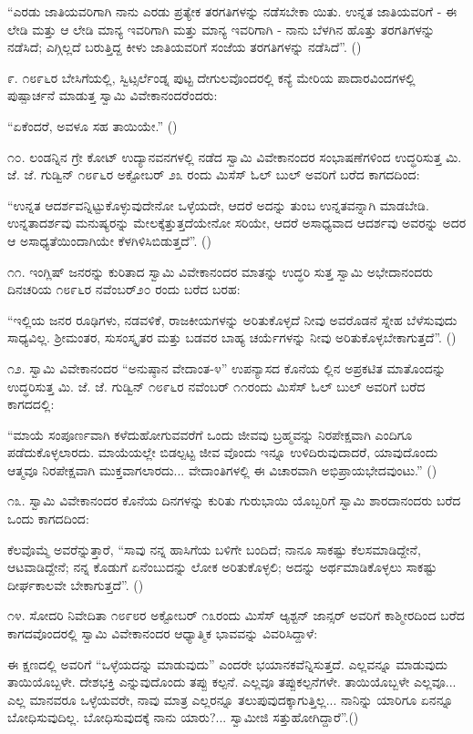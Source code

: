“ಎರಡು ಜಾತಿಯವರಿಗಾಗಿ ನಾನು ಎರಡು ಪ್ರತ್ಯೇಕ ತರಗತಿಗಳನ್ನು ನಡೆಸಬೇಕಾ ಯಿತು. ಉನ್ನತ ಜಾತಿಯವರಿಗೆ - ಈ ಲೇಡಿ ಮತ್ತು ಆ ಲೇಡಿ ಮಾನ್ಯ ಇವರಿಗಾಗಿ ಮತ್ತು ಮಾನ್ಯ ಇವರಿಗಾಗಿ - ನಾನು ಬೆಳಗಿನ ಹೊತ್ತು ತರಗತಿಗಳನ್ನು ನಡೆಸಿದೆ; ಎಗ್ಗಿಲ್ಲದೆ ಬರುತ್ತಿದ್ದ ಕೀಳು ಜಾತಿಯವರಿಗೆ ಸಂಜೆಯ ತರಗತಿಗಳನ್ನು ನಡೆಸಿದೆ”. ()

೯. ೧೮೯೬ರ ಬೇಸಿಗೆಯಲ್ಲಿ, ಸ್ವಿಟ್ಸರ್ಲೆಂಡ್ನ ಪುಟ್ಟ ದೇಗುಲವೊಂದರಲ್ಲಿ ಕನ್ಯೆ ಮೇರಿಯ ಪಾದಾರವಿಂದಗಳಲ್ಲಿ ಪುಷ್ಪಾರ್ಚನೆ ಮಾಡುತ್ತ ಸ್ವಾಮಿ ವಿವೇಕಾನಂದರೆಂದರು:

“ಏಕೆಂದರೆ, ಅವಳೂ ಸಹ ತಾಯಿಯೇ.” ()

೧೦. ಲಂಡನ್ನಿನ ಗ್ರೇ ಕೋಟ್ ಉದ್ಯಾನವನಗಳಲ್ಲಿ ನಡೆದ ಸ್ವಾಮಿ ವಿವೇಕಾನಂದರ ಸಂಭಾಷಣೆಗಳಿಂದ ಉದ್ಧರಿಸುತ್ತ ಮಿ. ಜೆ. ಜೆ. ಗುಡ್ವಿನ್ ೧೮೯೬ರ ಅಕ್ಟೋಬರ್ ೨೩ ರಂದು ಮಿಸೆಸ್ ಓಲ್ ಬುಲ್ ಅವರಿಗೆ ಬರೆದ ಕಾಗದದಿಂದ:

“ಉನ್ನತ ಆದರ್ಶವನ್ನಿಟ್ಟುಕೊಳ್ಳುವುದೇನೋ ಒಳ್ಳೆಯದೇ, ಆದರೆ ಅದನ್ನು ತುಂಬ ಉನ್ನತವನ್ನಾಗಿ ಮಾಡಬೇಡಿ. ಉನ್ನತಾದರ್ಶವು ಮನುಷ್ಯರನ್ನು ಮೇಲಕ್ಕೆತ್ತುತ್ತದೆಯೇನೋ ಸರಿಯೇ, ಆದರೆ ಅಸಾಧ್ಯವಾದ ಆದರ್ಶವು ಅವರನ್ನು ಅದರ ಆ ಅಸಾಧ್ಯತೆಯಿಂದಾಗಿಯೇ ಕೆಳಗಿಳಿಸಿಬಿಡುತ್ತದೆ”. ()

೧೧. ಇಂಗ್ಲಿಷ್ ಜನರನ್ನು ಕುರಿತಾದ ಸ್ವಾಮಿ ವಿವೇಕಾನಂದರ ಮಾತನ್ನು ಉದ್ಧರಿ ಸುತ್ತ ಸ್ವಾಮಿ ಅಭೇದಾನಂದರು ದಿನಚರಿಯ ೧೮೯೬ರ ನವೆಂಬರ್೨೦ ರಂದು ಬರೆದ ಬರಹ:

“ಇಲ್ಲಿಯ ಜನರ ರೂಢಿಗಳು, ನಡವಳಿಕೆ, ರಾಜಕೀಯಗಳನ್ನು ಅರಿತುಕೊಳ್ಳದೆ ನೀವು ಅವರೊಡನೆ ಸ್ನೇಹ ಬೆಳೆಸುವುದು ಸಾಧ್ಯವಿಲ್ಲ. ಶ‍್ರೀಮಂತರ, ಸುಸಂಸ್ಕೃತರ ಮತ್ತು ಬಡವರ ಬಾಹ್ಯ ಚರ್ಯೆಗಳನ್ನು ನೀವು ಅರಿತುಕೊಳ್ಳಬೇಕಾಗುತ್ತದೆ”. ()

೧೨. ಸ್ವಾಮಿ ವಿವೇಕಾನಂದರ “ಅನುಷ್ಠಾನ ವೇದಾಂತ-೪” ಉಪನ್ಯಾಸದ ಕೊನೆಯ ಲ್ಲಿನ ಅಪ್ರಕಟಿತ ಮಾತೊಂದನ್ನು ಉದ್ಧರಿಸುತ್ತ ಮಿ. ಜೆ. ಜೆ. ಗುಡ್ವಿನ್ ೧೮೯೬ರ ನವೆಂಬರ್ ೧೧ರಂದು ಮಿಸೆಸ್ ಓಲ್ ಬುಲ್ ಅವರಿಗೆ ಬರೆದ ಕಾಗದದಲ್ಲಿ:

“ಮಾಯೆ ಸಂಪೂರ್ಣವಾಗಿ ಕಳೆದುಹೋಗುವವರೆಗೆ ಒಂದು ಜೀವವು ಬ್ರಹ್ಮವನ್ನು ನಿರಪೇಕ್ಷವಾಗಿ ಎಂದಿಗೂ ಪಡೆದುಕೊಳ್ಳಲಾರದು. ಮಾಯೆಯಲ್ಲೇ ಬಿಡಲ್ಪಟ್ಟ ಜೀವ ವೊಂದು ಇನ್ನೂ ಉಳಿದಿರುವುದಾದರೆ, ಯಾವುದೊಂದು ಆತ್ಮವೂ ನಿರಪೇಕ್ಷವಾಗಿ ಮುಕ್ತವಾಗಲಾರದು... ವೇದಾಂತಿಗಳಲ್ಲಿ ಈ ವಿಚಾರವಾಗಿ ಅಭಿಪ್ರಾಯಭೇದವುಂಟು.” ()

೧೩. ಸ್ವಾಮಿ ವಿವೇಕಾನಂದರ ಕೊನೆಯ ದಿನಗಳನ್ನು ಕುರಿತು ಗುರುಭಾಯಿ ಯೊಬ್ಬರಿಗೆ ಸ್ವಾಮಿ ಶಾರದಾನಂದರು ಬರೆದ ಒಂದು ಕಾಗದದಿಂದ:

ಕೆಲವೊಮ್ಮೆ ಅವರೆನ್ನುತ್ತಾರೆ, “ಸಾವು ನನ್ನ ಹಾಸಿಗೆಯ ಬಳಿಗೇ ಬಂದಿದೆ; ನಾನೂ ಸಾಕಷ್ಟು ಕೆಲಸಮಾಡಿದ್ದೇನೆ, ಆಟವಾಡಿದ್ದೇನೆ; ನನ್ನ ಕೊಡುಗೆ ಏನೆಂಬುದನ್ನು ಲೋಕ ಅರಿತುಕೊಳ್ಳಲಿ; ಅದನ್ನು ಅರ್ಥಮಾಡಿಕೊಳ್ಳಲು ಸಾಕಷ್ಟು ದೀರ್ಘಕಾಲವೇ ಬೇಕಾಗುತ್ತದೆ”. ()

೧೪. ಸೋದರಿ ನಿವೇದಿತಾ ೧೮೯೮ರ ಅಕ್ಟೋಬರ್ ೧೩ರಂದು ಮಿಸೆಸ್ ಆ್ಯಶ್ಟನ್ ಜಾನ್ಸರ್ ಅವರಿಗೆ ಕಾಶ್ಮೀರದಿಂದ ಬರೆದ ಕಾಗದವೊಂದರಲ್ಲಿ ಸ್ವಾಮಿ ವಿವೇಕಾನಂದರ ಆಧ್ಯಾತ್ಮಿಕ ಭಾವವನ್ನು ವಿವರಿಸಿದ್ದಾಳೆ:

ಈ ಕ್ಷಣದಲ್ಲಿ ಅವರಿಗೆ “ಒಳ್ಳೆಯದನ್ನು ಮಾಡುವುದು” ಎಂದರೇ ಭಯಾನಕವೆನ್ನಿಸುತ್ತದೆ. ಎಲ್ಲವನ್ನೂ ಮಾಡುವುದು ತಾಯಿಯೊಬ್ಬಳೇ. ದೇಶಭಕ್ತಿ ಎನ್ನುವುದೊಂದು ತಪ್ಪು ಕಲ್ಪನೆ. ಎಲ್ಲವೂ ತಪ್ಪುಕಲ್ಪನೆಗಳೇ. ತಾಯಿಯೊಬ್ಬಳೇ ಎಲ್ಲವೂ... ಎಲ್ಲ ಮಾನವರೂ ಒಳ್ಳೆಯವರೇ, ನಾವು ಮಾತ್ರ ಎಲ್ಲರನ್ನೂ ತಲುಪುವುದಕ್ಕಾಗುತ್ತಿಲ್ಲ... ನಾನಿನ್ನು ಯಾರಿಗೂ ಏನನ್ನೂ ಬೋಧಿಸುವುದಿಲ್ಲ. ಬೋಧಿಸುವುದಕ್ಕೆ ನಾನು ಯಾರು?... ಸ್ವಾಮೀಜಿ ಸತ್ತುಹೋಗಿದ್ದಾರೆ”.()

